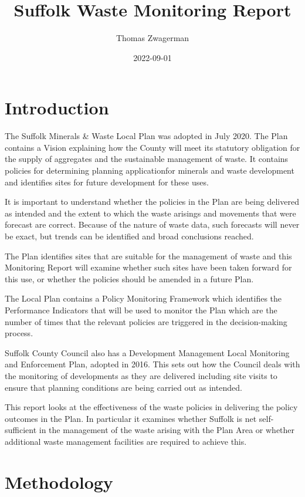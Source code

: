 \documentclass[
]{article}
\title{Suffolk Waste Monitoring Report}
\author{Thomas Zwagerman}
\date{2022-09-01}
\begin{document}
\maketitle

{
\setcounter{tocdepth}{2}
\tableofcontents
}
\hypertarget{introduction}{%
\section{Introduction}\label{introduction}}

The Suffolk Minerals \& Waste Local Plan was adopted in July 2020. The
Plan contains a Vision explaining how the County will meet its statutory
obligation for the supply of aggregates and the sustainable management
of waste. It contains policies for determining planning applicationfor
minerals and waste development and identifies sites for future
development for these uses.

It is important to understand whether the policies in the Plan are being
delivered as intended and the extent to which the waste arisings and
movements that were forecast are correct. Because of the nature of waste
data, such forecasts will never be exact, but trends can be identified
and broad conclusions reached.

The Plan identifies sites that are suitable for the management of waste
and this Monitoring Report will examine whether such sites have been
taken forward for this use, or whether the policies should be amended in
a future Plan.

The Local Plan contains a Policy Monitoring Framework which identifies
the Performance Indicators that will be used to monitor the Plan which
are the number of times that the relevant policies are triggered in the
decision-making process.

Suffolk County Council also has a Development Management Local
Monitoring and Enforcement Plan, adopted in 2016. This sets out how the
Council deals with the monitoring of developments as they are delivered
including site visits to ensure that planning conditions are being
carried out as intended.

This report looks at the effectiveness of the waste policies in
delivering the policy outcomes in the Plan. In particular it examines
whether Suffolk is net self-sufficient in the management of the waste
arising with the Plan Area or whether additional waste management
facilities are required to achieve this.

\hypertarget{methodology}{%
\section{Methodology}\label{methodology}}
\end{document}
